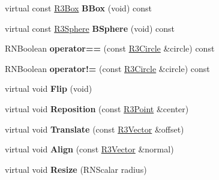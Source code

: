 \begin{DoxyCompactItemize}
\item 
virtual const \hyperlink{class_r3_box}{R3\+Box} {\bfseries B\+Box} (void) const \hypertarget{class_r3_circle_abadb4dd2ca61ca2da7c54e94acde4282}{}\label{class_r3_circle_abadb4dd2ca61ca2da7c54e94acde4282}

\item 
virtual const \hyperlink{class_r3_sphere}{R3\+Sphere} {\bfseries B\+Sphere} (void) const \hypertarget{class_r3_circle_ae868260f264bba4b5cdde5867e7eb3d9}{}\label{class_r3_circle_ae868260f264bba4b5cdde5867e7eb3d9}

\item 
R\+N\+Boolean {\bfseries operator==} (const \hyperlink{class_r3_circle}{R3\+Circle} \&circle) const \hypertarget{class_r3_circle_af416ac92104eff59475fbe5f5916c128}{}\label{class_r3_circle_af416ac92104eff59475fbe5f5916c128}

\item 
R\+N\+Boolean {\bfseries operator!=} (const \hyperlink{class_r3_circle}{R3\+Circle} \&circle) const \hypertarget{class_r3_circle_afed04da36f022d79d8672cdff693edd6}{}\label{class_r3_circle_afed04da36f022d79d8672cdff693edd6}

\item 
virtual void {\bfseries Flip} (void)\hypertarget{class_r3_circle_a8610f89a99f065e6007bd4baec2732e3}{}\label{class_r3_circle_a8610f89a99f065e6007bd4baec2732e3}

\item 
virtual void {\bfseries Reposition} (const \hyperlink{class_r3_point}{R3\+Point} \&center)\hypertarget{class_r3_circle_a308b7d6c871abc638d8cd9ca0bb6ee50}{}\label{class_r3_circle_a308b7d6c871abc638d8cd9ca0bb6ee50}

\item 
virtual void {\bfseries Translate} (const \hyperlink{class_r3_vector}{R3\+Vector} \&offset)\hypertarget{class_r3_circle_a3746243e5666479a94e4a8aa251dfddd}{}\label{class_r3_circle_a3746243e5666479a94e4a8aa251dfddd}

\item 
virtual void {\bfseries Align} (const \hyperlink{class_r3_vector}{R3\+Vector} \&normal)\hypertarget{class_r3_circle_a79d8effef35cf1420c1472f692809e9b}{}\label{class_r3_circle_a79d8effef35cf1420c1472f692809e9b}

\item 
virtual void {\bfseries Resize} (R\+N\+Scalar radius)\hypertarget{class_r3_circle_afc4b5c2f74e8686f2ca9e1788cfbd34d}{}\label{class_r3_circle_afc4b5c2f74e8686f2ca9e1788cfbd34d}


\end{DoxyCompactItemize}
